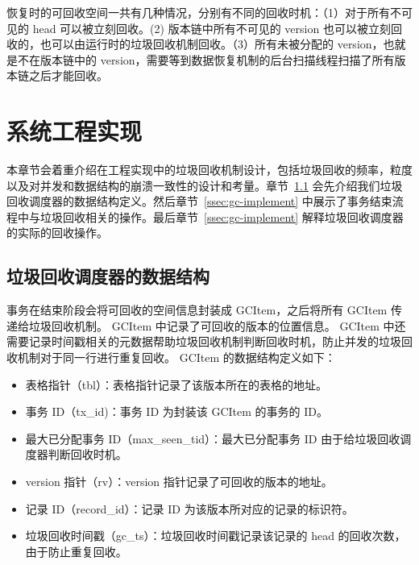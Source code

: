 恢复时的可回收空间一共有几种情况，分别有不同的回收时机：（1）对于所有不可见的 head 可以被立刻回收。(2) 版本链中所有不可见的 version 也可以被立刻回收的，也可以由运行时的垃圾回收机制回收。（3）所有未被分配的 version，也就是不在版本链中的 version，需要等到数据恢复机制的后台扫描线程扫描了所有版本链之后才能回收。


\section{系统工程实现}
\label{sec:implement}

本章节会着重介绍在工程实现中的垃圾回收机制设计，包括垃圾回收的频率，粒度以及对并发和数据结构的崩溃一致性的设计和考量。章节~\ref{ssec:gc-metadata} 会先介绍我们垃圾回收调度器的数据结构定义。然后章节~\ref{ssec:gc-implement} 中展示了事务结束流程中与垃圾回收相关的操作。最后章节~\ref{ssec:gc-implement} 解释垃圾回收调度器的实际的回收操作。

\subsection{垃圾回收调度器的数据结构}
\label{ssec:gc-metadata}


事务在结束阶段会将可回收的空间信息封装成 GCItem，之后将所有 GCItem 传递给垃圾回收机制。
GCItem 中记录了可回收的版本的位置信息。
GCItem 中还需要记录时间戳相关的元数据帮助垃圾回收机制判断回收时机，防止并发的垃圾回收机制对于同一行进行重复回收。
GCItem 的数据结构定义如下：
\begin{itemize}
    \item 表格指针（tbl）：表格指针记录了该版本所在的表格的地址。
    \item 事务 ID（tx\_id)：事务 ID 为封装该 GCItem 的事务的 ID。
    \item 最大已分配事务 ID（max\_seen\_tid）：最大已分配事务 ID 由于给垃圾回收调度器判断回收时机。
    \item version 指针（rv）：version 指针记录了可回收的版本的地址。
    \item 记录 ID（record\_id）：记录 ID 为该版本所对应的记录的标识符。
    \item 垃圾回收时间戳（gc\_ts）：垃圾回收时间戳记录该记录的 head 的回收次数，由于防止重复回收。
\end{itemize}

